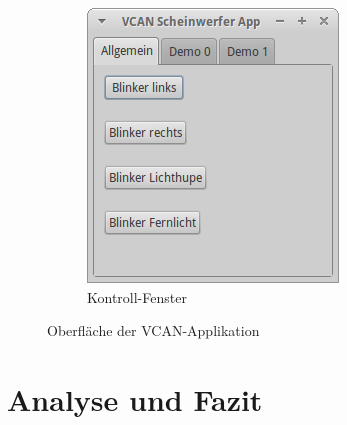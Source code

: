 \documentclass[draft]{beamer}
\begin{document}
\begin{frame}
\begin{figure}
\begin{subfigure}[b]{0.39\textwidth}
            \includegraphics[width=\textwidth]{vcan_app_control}
            \caption{Kontroll-Fenster}
            \label{fig:vcan_app_control}
        \end{subfigure}
        \caption{Oberfläche der VCAN-Applikation}
        \label{fig:vcan_app}
    \end{figure}
\end{frame}





\section{Analyse und Fazit}
\label{sec:analyse_fazit}

\end{document}
